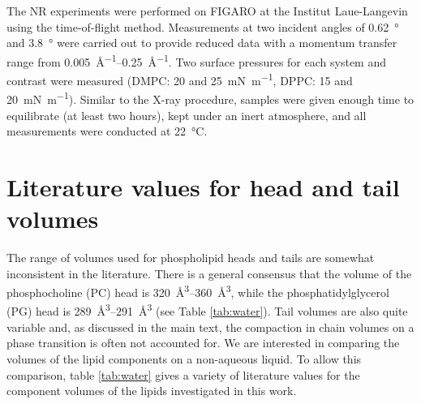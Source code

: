 \documentclass[11pt,a4paper]{paper}
\begin{document}
The NR experiments were performed on FIGARO at the Institut Laue-Langevin using the time-of-flight method.\cite{Campbell2011} Measurements at two incident angles of \SI{0.62}{\degree} and \SI{3.8}{\degree} were carried out to provide reduced data with a momentum transfer range from \SIrange{0.005}{0.25}{\AA^{-1}}. Two surface pressures for each system and contrast were measured (DMPC: 20 and \SI{25}{\milli\newton\meter^{-1}}, DPPC: 15 and \SI{20}{\milli\newton\meter^{-1}}). Similar to the X-ray procedure, samples were given enough time to equilibrate (at least two hours), kept under an inert atmosphere, and all measurements were conducted at \SI{22}{\celsius}.

\section{Literature values for head and tail volumes}
The range of volumes used for phospholipid heads and tails are somewhat inconsistent in the literature. There is a general consensus that the volume of the phosphocholine (PC) head is \SIrange{320}{360}{\cubic\angstrom}, while the phosphatidylglycerol (PG) head is \SIrange{289}{291}{\cubic\angstrom} (see Table \ref{tab:water}).
Tail volumes are also quite variable and, as discussed in the main text, the compaction in chain volumes on a phase transition is often not accounted for\cite{Campbell2018}.
We are interested in comparing the volumes of the lipid components on a non-aqueous liquid.
To allow this comparison, table \ref{tab:water} gives a variety of literature values for the component volumes of the lipids investigated in this work.
\end{document}
